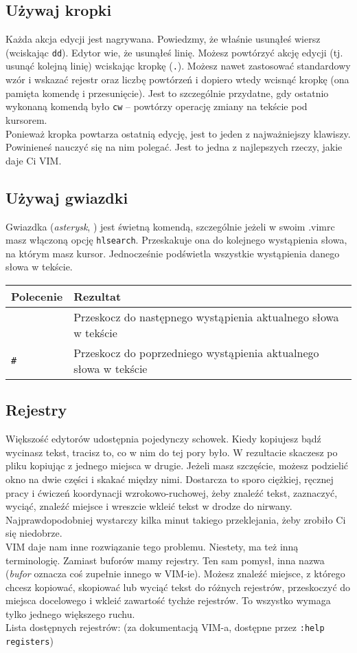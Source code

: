 \documentclass[a4paper,12pt]{article}
\begin{document}
\subsection{Używaj kropki}
Każda akcja edycji jest nagrywana. Powiedzmy, że właśnie usunąłeś wiersz (wciskając {\tt dd}). Edytor wie, że usunąłeś linię. Możesz powtórzyć akcję edycji (tj. usunąć kolejną linię) wciskając kropkę ({\tt .}). Możesz nawet zastosować standardowy wzór i wskazać rejestr oraz liczbę powtórzeń i dopiero wtedy wcisnąć kropkę (ona pamięta komendę i przesunięcie). Jest to szczególnie przydatne, gdy ostatnio wykonaną komendą było {\tt cw} – powtórzy operację zmiany na tekście pod kursorem.\\
Ponieważ kropka powtarza ostatnią edycję, jest to jeden z najważniejszy klawiszy. Powinieneś nauczyć się na nim polegać. Jest to jedna z najlepszych rzeczy, jakie daje Ci VIM.
\subsection{Używaj gwiazdki}
Gwiazdka ({\it asterysk}, {\tt *}) jest świetną komendą, szczególnie jeżeli w swoim .vimrc masz włączoną opcję {\tt hlsearch}. Przeskakuje ona do kolejnego wystąpienia słowa, na którym masz kursor. Jednocześnie podświetla wszystkie wystąpienia danego słowa w tekście.

\begin{tabular}{ l | p{} }
{\bf Polecenie} & {\bf Rezultat} \\ \hline
{\tt *} & Przeskocz do następnego wystąpienia aktualnego słowa w tekście\\
{\tt \#} & Przeskocz do poprzedniego wystąpienia aktualnego słowa w tekście \\ \hline
\end{tabular}
\subsection{Rejestry}
Większość edytorów udostępnia pojedynczy schowek. Kiedy kopiujesz bądź wycinasz tekst, tracisz to, co w nim do tej pory było. W rezultacie skaczesz po pliku kopiując z jednego miejsca w drugie. Jeżeli masz szczęście, możesz podzielić okno na dwie części i skakać między nimi. Dostarcza to sporo ciężkiej, ręcznej pracy i ćwiczeń koordynacji wzrokowo-ruchowej, żeby znaleźć tekst, zaznaczyć, wyciąć, znaleźć miejsce i wreszcie wkleić tekst w drodze do nirwany.\\
Najprawdopodobniej wystarczy kilka minut takiego przeklejania, żeby zrobiło Ci się niedobrze.\\
VIM daje nam inne rozwiązanie tego problemu. Niestety, ma też inną terminologię. Zamiast buforów mamy rejestry. Ten sam pomysł, inna nazwa ({\it bufor} oznacza coś zupełnie innego w VIM-ie). Możesz znaleźć miejsce, z którego chcesz kopiować, skopiować lub wyciąć tekst do różnych rejestrów, przeskoczyć do miejsca docelowego i wkleić zawartość tychże rejestrów. To wszystko wymaga tylko jednego większego ruchu.\\
Lista dostępnych rejestrów: (za dokumentacją VIM-a, dostępne przez {\tt :help registers})
\end{document}
